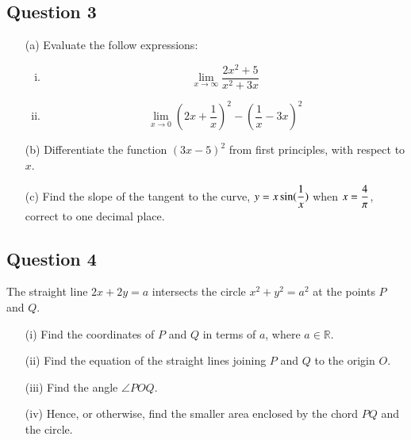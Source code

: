 \documentclass[12pt]{article}
\begin{document}
\newpage
\subsection*{Question 3}

\begin{itemize}

\item[(a)] Evaluate the follow expressions:

\begin{multicols}{2}
\begin{enumerate}[(i)]
	
	\item $$ \lim\limits_{x \rightarrow \infty} \frac{2x^2+5}{x^2+3x}$$
	
	\item $$ \lim\limits_{x \rightarrow 0} \left(2x + \frac{1}{x} \right)^2 - \left(\frac{1}{x}-3x \right)^2$$
	

\end{enumerate}
\end{multicols}

\item[(b)] Differentiate the function $(3x-5)^2$ from first principles, with respect to $x$.

\item[(c)] Find the slope of the tangent to the curve, $ \displaystyle y = x \sin( {1 \over x})$ when $\displaystyle x = {4 \over \pi }$, correct to one decimal place.


\end{itemize}


\medskip
\subsection*{Question 4}


The straight line $2x+2y = a$ intersects the circle $x^2 +y^2 = a^2$ at the points $P$ and $Q$.

\begin{itemize}
	\item[(i)] Find the coordinates of $P$ and $Q$ in terms of $a$, where $a \in \mathbb{R}$.
	\item[(ii)] Find the equation of the straight lines joining $P$ and $Q$ to the origin $O$.
	\item[(iii)] Find the angle $\angle POQ$.
	\item[(iv)] Hence, or otherwise, find the smaller area enclosed by the chord $PQ$ and the circle.
\end{itemize}
\end{document}
